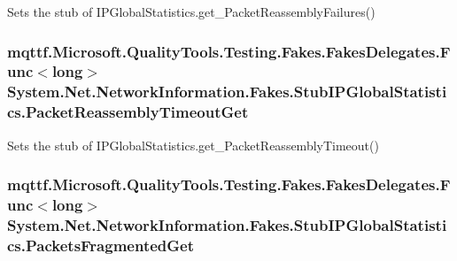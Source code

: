 Sets the stub of I\-P\-Global\-Statistics.\-get\-\_\-\-Packet\-Reassembly\-Failures()

\hypertarget{class_system_1_1_net_1_1_network_information_1_1_fakes_1_1_stub_i_p_global_statistics_a47d7e66531087a5eec02d994009c49a7}{
\subsubsection[{Packet\-Reassembly\-Timeout\-Get}]{\setlength{\rightskip}{0pt plus 5cm}mqttf.\-Microsoft.\-Quality\-Tools.\-Testing.\-Fakes.\-Fakes\-Delegates.\-Func$<$long$>$ System.\-Net.\-Network\-Information.\-Fakes.\-Stub\-I\-P\-Global\-Statistics.\-Packet\-Reassembly\-Timeout\-Get}}\label{class_system_1_1_net_1_1_network_information_1_1_fakes_1_1_stub_i_p_global_statistics_a47d7e66531087a5eec02d994009c49a7}


Sets the stub of I\-P\-Global\-Statistics.\-get\-\_\-\-Packet\-Reassembly\-Timeout()

\hypertarget{class_system_1_1_net_1_1_network_information_1_1_fakes_1_1_stub_i_p_global_statistics_ae1e44b33c20a200146976d3576bbb266}{
\subsubsection[{Packets\-Fragmented\-Get}]{\setlength{\rightskip}{0pt plus 5cm}mqttf.\-Microsoft.\-Quality\-Tools.\-Testing.\-Fakes.\-Fakes\-Delegates.\-Func$<$long$>$ System.\-Net.\-Network\-Information.\-Fakes.\-Stub\-I\-P\-Global\-Statistics.\-Packets\-Fragmented\-Get}}\label{class_system_1_1_net_1_1_network_information_1_1_fakes_1_1_stub_i_p_global_statistics_ae1e44b33c20a200146976d3576bbb266}


